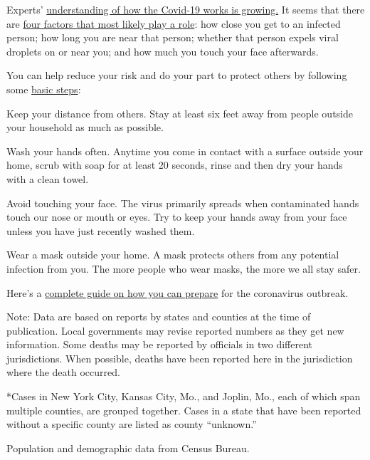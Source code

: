 Experts'
\href{https://www.nytimes.com/2020/06/02/health/coronavirus-profile-covid.html}{understanding
of how the Covid-19 works is growing.} It seems that there are
\href{https://www.nytimes.com/2020/03/02/health/coronavirus-how-it-spreads.html}{four
factors that most likely play a role}: how close you get to an infected
person; how long you are near that person; whether that person expels
viral droplets on or near you; and how much you touch your face
afterwards.

You can help reduce your risk and do your part to protect others by
following some
\href{https://www.nytimes.com/article/prepare-for-coronavirus.html?action=click\&pgtype=Article\&state=default\&module=styln-coronavirus\&variant=show®ion=TOP_BANNER\&context=storyline_menu\#link-56871453}{basic
steps}:

Keep your distance from others. Stay at least six feet away from people
outside your household as much as possible.

Wash your hands often. Anytime you come in contact with a surface
outside your home, scrub with soap for at least 20 seconds, rinse and
then dry your hands with a clean towel.

Avoid touching your face. The virus primarily spreads when contaminated
hands touch our nose or mouth or eyes. Try to keep your hands away from
your face unless you have just recently washed them.

Wear a mask outside your home. A mask protects others from any potential
infection from you. The more people who wear masks, the more we all stay
safer.

Here's a
\href{https://www.nytimes.com/interactive/2020/world/coronavirus-tips-advice.html}{complete
guide on how you can prepare} for the coronavirus outbreak.

Note: Data are based on reports by states and counties at the time of
publication. Local governments may revise reported numbers as they get
new information. Some deaths may be reported by officials in two
different jurisdictions. When possible, deaths have been reported here
in the jurisdiction where the death occurred.

*Cases in New York City, Kansas City, Mo., and Joplin, Mo., each of
which span multiple counties, are grouped together. Cases in a state
that have been reported without a specific county are listed as county
``unknown.''

Population and demographic data from Census Bureau.

